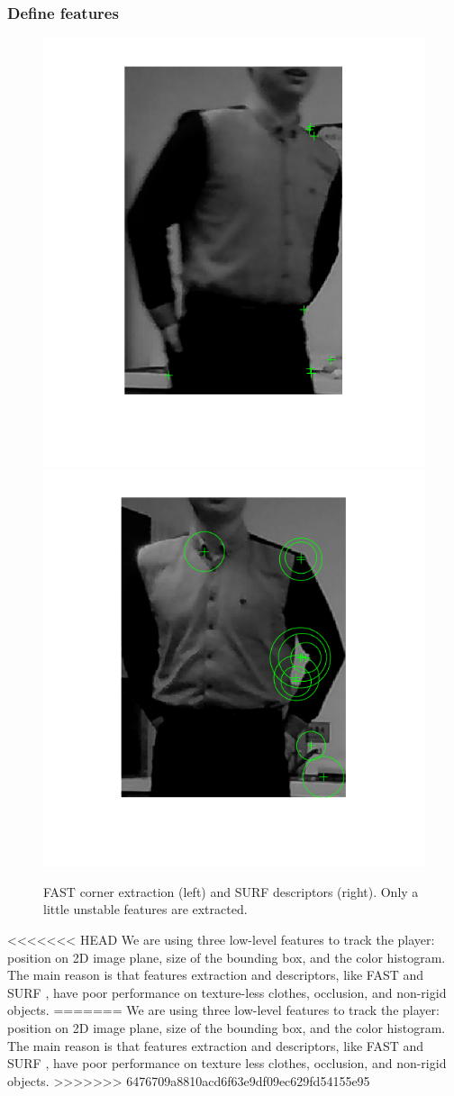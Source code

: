 \documentclass[11pt,twocolumn,letterpaper]{article}
\begin{document}
\subsubsection*{Define features}
      \begin{figure}[h]
      \centering
      \includegraphics[width=0.45\linewidth]{./Pic/FAST.png}
	\includegraphics[width=0.45\linewidth]{./Pic/SURF.png}
      \caption{FAST corner extraction (left) and SURF descriptors (right). Only a little unstable features are extracted.}
      \end{figure}
<<<<<<< HEAD
We are using three low-level features to track the player: position on 2D image plane, size of the bounding box, and the color histogram. The main reason is that features extraction and descriptors, like FAST \cite{1544896} and SURF \cite{Bay2006}, have poor performance on texture-less clothes, occlusion, and non-rigid objects.
=======
We are using three low-level features to track the player: position on 2D image plane, size of the bounding box, and the color histogram. The main reason is that features extraction and descriptors, like FAST \cite{1544896} and SURF \cite{Bay2006}, have poor performance on texture less clothes, occlusion, and non-rigid objects.
>>>>>>> 6476709a8810acd6f63e9df09ec629fd54155e95
\end{document}
